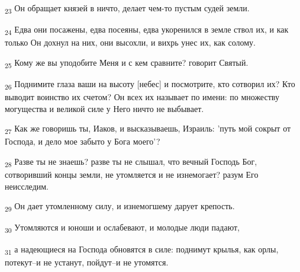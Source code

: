 \begin{tcolorbox}
\textsubscript{23} Он обращает князей в ничто, делает чем-то пустым судей земли.
\end{tcolorbox}
\begin{tcolorbox}
\textsubscript{24} Едва они посажены, едва посеяны, едва укоренился в земле ствол их, и как только Он дохнул на них, они высохли, и вихрь унес их, как солому.
\end{tcolorbox}
\begin{tcolorbox}
\textsubscript{25} Кому же вы уподобите Меня и с кем сравните? говорит Святый.
\end{tcolorbox}
\begin{tcolorbox}
\textsubscript{26} Поднимите глаза ваши на высоту [небес] и посмотрите, кто сотворил их? Кто выводит воинство их счетом? Он всех их называет по имени: по множеству могущества и великой силе у Него ничто не выбывает.
\end{tcolorbox}
\begin{tcolorbox}
\textsubscript{27} Как же говоришь ты, Иаков, и высказываешь, Израиль: 'путь мой сокрыт от Господа, и дело мое забыто у Бога моего'?
\end{tcolorbox}
\begin{tcolorbox}
\textsubscript{28} Разве ты не знаешь? разве ты не слышал, что вечный Господь Бог, сотворивший концы земли, не утомляется и не изнемогает? разум Его неисследим.
\end{tcolorbox}
\begin{tcolorbox}
\textsubscript{29} Он дает утомленному силу, и изнемогшему дарует крепость.
\end{tcolorbox}
\begin{tcolorbox}
\textsubscript{30} Утомляются и юноши и ослабевают, и молодые люди падают,
\end{tcolorbox}
\begin{tcolorbox}
\textsubscript{31} а надеющиеся на Господа обновятся в силе: поднимут крылья, как орлы, потекут--и не устанут, пойдут--и не утомятся.
\end{tcolorbox}
